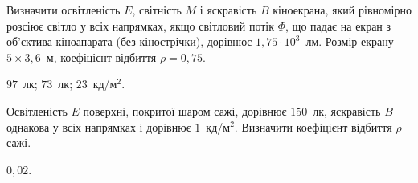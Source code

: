\begin{problem}%
Визначити освітленість $E$, світність $M$ і яскравість $B$ кіноекрана, який
рівномірно розсіює світло у всіх напрямках, якщо світловий потік $\Phi$, що
падає на екран з об'єктива кіноапарата (без кінострічки), дорівнює
$1,75\cdot10^3$~лм. Розмір екрану $5 \times 3,6$~м, коефіцієнт відбиття $\rho = 0,75$.
\begin{solution}
	$97$~лк; $73$~лк; $23$~кд/м$^2$.
\end{solution}
\end{problem}


\begin{problem}%
Освітленість $E$ поверхні, покритої шаром сажі, дорівнює $150$~лк,
яскравість $B$ однакова у всіх напрямках і дорівнює $1$~кд/м$^2$. Визначити
коефіцієнт відбиття $\rho$ сажі.
\begin{solution}
	$0,02$.
\end{solution}
\end{problem}



